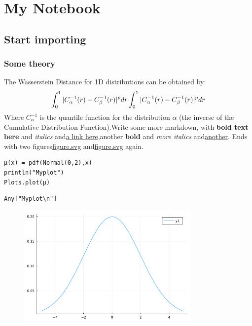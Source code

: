 \newpage

\chapter{My Notebook}

\section{Start importing}

\subsection{Some theory}
The Wasserstein Distance for 1D distributions can be obtained by:
\begin{displaymath}
	\int_0^1 |C_\alpha^{-1}(r) - C_\beta^{-1}(r)|^p dr \\
	\int_0^1 |C_\alpha^{-1}(r) - C_\beta^{-1}(r)|^p dr
\end{displaymath}
Where $C_\alpha^{-1}$ is the quantile function for the distribution $\alpha$ (the inverse of the Cumulative Distribution Function).Write some more markdown, with \textbf{bold text here} and \textit{italics} and\href{https://juliaoptimaltransport.github.io/OptimalTransport.jl/stable/examples/basic/}{a link here},another \textbf{bold} and \textit{more italics} and\href{https://github.com/}{another}. Ends with two figures\href{Figure}{figure.svg} and\href{Figure 2}{figure.svg} again.
\begin{lstlisting}[language=JuliaLocal, style=julia]
μ(x) = pdf(Normal(0,2),x)
println("Myplot")
Plots.plot(μ)
\end{lstlisting}

\begin{verbatim}
Any["Myplot\n"]
\end{verbatim}

\begin{figure}[H]
	\centering
	\includegraphics[width=0.8\textwidth]{./figures/jupyternotebook_figure1.pdf}
	\label{fig:jupyternotebook_figure1}

\end{figure}

